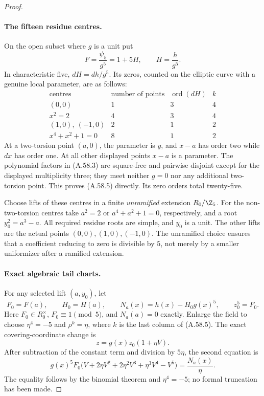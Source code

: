 \begin{proof}
\paragraph{The fifteen residue centres.}
On the open subset where \(g\) is a unit put
\[
              F=\frac{\psi _5}{g^5}=1+5H,
                         \qquad H=\frac h{g^5}.        \tag{A.58.4}
\]
In characteristic five, \(dH=dh/g^5\). Its zeros, counted
on the elliptic curve with a genuine local parameter, are as follows:
\[
\begin{array}{c|c|c|c}
 \text{centres}&\text{number of points}&\operatorname{ord}(dH)&k\\
 \hline
 (0,0)&1&3&4\\
 x^2=2&4&3&4\\
 (1,0),\ (-1,0)&2&1&2\\
 x^4+x^2+1=0&8&1&2
\end{array}                                                   \tag{A.58.5}
\]
At a two-torsion point \((a,0)\), the parameter is \(y\),
and \(x-a\) has order two while \(dx\) has order one.
At all other displayed points \(x-a\) is a parameter.
The polynomial factors in (A.58.3) are square-free and
pairwise disjoint except for the displayed multiplicity three;
they meet neither \(g=0\) nor any additional two-torsion point.
This proves (A.58.5) directly. Its zero orders total twenty-five.

Choose lifts of these centres in a finite \emph{unramified}
extension \(R_0/\Z_5\). For the non-two-torsion centres take
\(a^2=2\) or \(a^4+a^2+1=0\), respectively, and a root
\(y_0^2=a^3-a\). All required residue roots are simple,
and \(y_0\) is a unit. The other lifts are the actual
points \((0,0),(1,0),(-1,0)\). The unramified choice
ensures that a coefficient reducing to zero is divisible
by \(5\), not merely by a smaller uniformizer after a
ramified extension.

\paragraph{Exact algebraic tail charts.}
For any selected lift \((a,y_0)\), let
\[
 F_0=F(a),\qquad H_0=H(a),\qquad
 N_a(x)=h(x)-H_0g(x)^5,
 \qquad z_0^5=F_0.                                    \tag{A.58.6}
\]
Here \(F_0\in R_0^\times\), \(F_0\equiv1\pmod5\),
and \(N_a(a)=0\) exactly. Enlarge the field to choose
\(\eta^4=-5\) and \(\rho^k=\eta\), where \(k\) is
the last column of (A.58.5). The exact covering-coordinate change is
\[
                    z=g(x)z_0(1+\eta V).
\]
After subtraction of the constant term and division by \(5\eta\),
the second equation is
\[
 g(x)^5F_0
   \bigl(V+2\eta V^2+2\eta^2V^3+\eta^3V^4-V^5\bigr)
                         =\frac{N_a(x)}{\eta}.        \tag{A.58.7}
\]
The equality follows by the binomial theorem and \(\eta^4=-5\);
no formal truncation has been made.


\end{proof}

